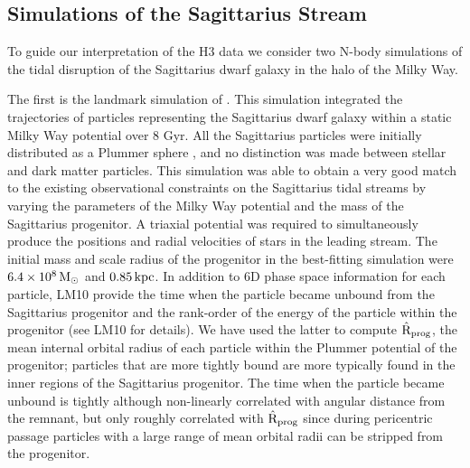 \documentclass[twocolumn,tighten,twocolappendix]{aastex63}
\newcommand{\sgr}{Sagittarius}
\begin{document}
\begin{CJK*}{UTF8}{gbsn}
\section{Simulations of the Sagittarius Stream}
\label{sec:simulations}

To guide our interpretation of the H3 data we consider two N-body simulations of the tidal disruption of the \sgr{} dwarf galaxy in the halo of the Milky Way.

The first is the landmark simulation of \citet[][LM10 hereafter]{LM10}.  This simulation integrated the trajectories of particles representing the \sgr{} dwarf galaxy within a static Milky Way potential over 8 Gyr.  All the \sgr{} particles were initially distributed as a Plummer sphere \citep{Plummer1911}, and no distinction was made between stellar and dark matter particles. This simulation was able to obtain a very good match to the existing observational constraints on the \sgr{} tidal streams by varying the parameters of the Milky Way potential and the mass of the \sgr{} progenitor.  A triaxial potential was required to simultaneously produce the positions and radial velocities of stars in the leading stream. The initial mass and scale radius of the progenitor in the best-fitting simulation were $6.4\times 10^8 \, {\rm M}_\odot$ and $0.85 \, {\rm kpc}$.  In addition to 6D phase space information for each particle, LM10 provide the time when the particle became unbound from the \sgr{} progenitor and the rank-order of the energy of the particle within the progenitor (see LM10 for details). We have used the latter to compute $\hat{\rm R}_{\rm prog}$, the mean internal orbital radius of each particle within the Plummer potential of the progenitor; particles that are more tightly bound are more typically found in the inner regions of the \sgr{} progenitor. The time when the particle became unbound is tightly although non-linearly correlated with angular distance from the remnant, but only roughly correlated with $\hat{\rm R}_{\rm prog}$ since during pericentric passage particles with a large range of mean orbital radii can be stripped from the progenitor.


\end{CJK*}
\end{document}
